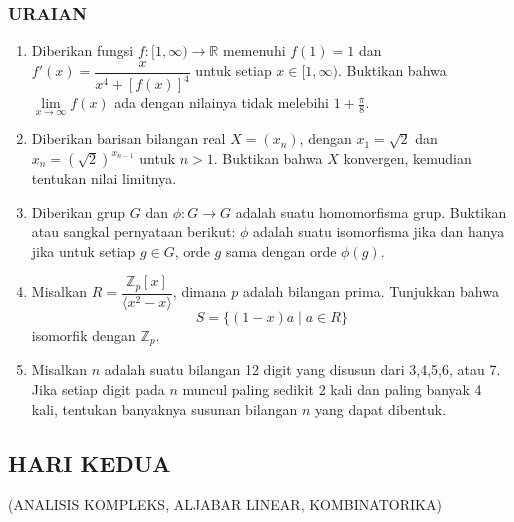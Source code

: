 \documentclass[12pt,twoside]{article}
\begin{document}
\subsubsection*{URAIAN}
\begin{enumerate}
	\item Diberikan fungsi $f : [1,\infty) \to \mathbb{R}$ memenuhi $f(1) = 1$ dan $f'(x) = \dfrac{x}{x^4 + [f(x)]^4}$ untuk setiap $x \in [1, \infty)$. Buktikan bahwa $\lim\limits_{x \to \infty} f(x)$ ada dengan nilainya tidak melebihi $1 + \frac{\pi}{8}$.

	\item Diberikan barisan bilangan real $X = (x_n)$, dengan $x_1 = \sqrt{2}$ dan $x_n = (\sqrt{2})^{x_{n-1}}$ untuk $n > 1$. Buktikan bahwa $X$ konvergen, kemudian tentukan nilai limitnya.

	\item Diberikan grup $G$ dan $\phi : G \to G$ adalah suatu homomorfisma grup. Buktikan atau sangkal pernyataan berikut: $\phi$ adalah suatu isomorfisma jika dan hanya jika untuk setiap $g \in G$, orde $g$ sama dengan orde $\phi(g)$.

	\item Misalkan $R = \dfrac{\mathbb{Z}_p[x]}{\langle x^2 - x \rangle}$, dimana $p$ adalah bilangan prima. Tunjukkan bahwa
	      \[
		      S = \{(1-x)a \mid a \in R\}
	      \]
	      isomorfik dengan $\mathbb{Z}_p$.

	\item Misalkan $n$ adalah suatu bilangan 12 digit yang disusun dari 3,4,5,6, atau 7. Jika setiap digit pada $n$ muncul paling sedikit 2 kali dan paling banyak 4 kali, tentukan banyaknya susunan bilangan $n$ yang dapat dibentuk.
\end{enumerate}
\newpage
\subsection{HARI KEDUA}
\begin{center}
	(ANALISIS KOMPLEKS, ALJABAR LINEAR, KOMBINATORIKA)
\end{center}
\end{document}
